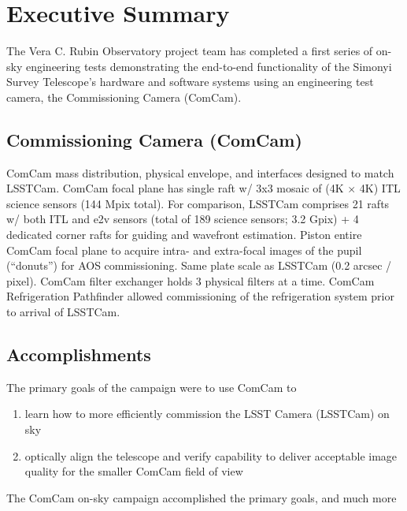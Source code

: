 \section{Executive Summary}
\label{sec:summary}

The Vera C. Rubin Observatory project team has completed a first series of on-sky engineering tests demonstrating the end-to-end functionality of the Simonyi Survey Telescope's hardware and software systems using an engineering test camera, the Commissioning Camera (ComCam).

\subsection{Commissioning Camera (ComCam)}

ComCam mass distribution, physical envelope, and interfaces designed to match LSSTCam.
ComCam focal plane has single raft w/ 3x3 mosaic of (4K $\times$ 4K) ITL science sensors (144 Mpix total).
For comparison, LSSTCam comprises 21 rafts w/ both ITL and e2v sensors (total of 189 science sensors; 3.2 Gpix) + 4 dedicated corner rafts for guiding and wavefront estimation.
Piston entire ComCam focal plane to acquire intra- and extra-focal images of the pupil (``donuts'') for AOS commissioning.
Same plate scale as LSSTCam (0.2 arcsec / pixel).
ComCam filter exchanger holds 3 physical filters at a time.
ComCam Refrigeration Pathfinder allowed commissioning of the refrigeration system prior to arrival of LSSTCam.

\subsection{Accomplishments}

The primary goals of the campaign were to use ComCam to

\begin{enumerate}
    \item learn how to more efficiently commission the LSST Camera (LSSTCam) on sky
    \item optically align the telescope and verify capability to deliver acceptable image quality for the smaller ComCam field of view
\end{enumerate}

The ComCam on-sky campaign accomplished the primary goals, and much more

